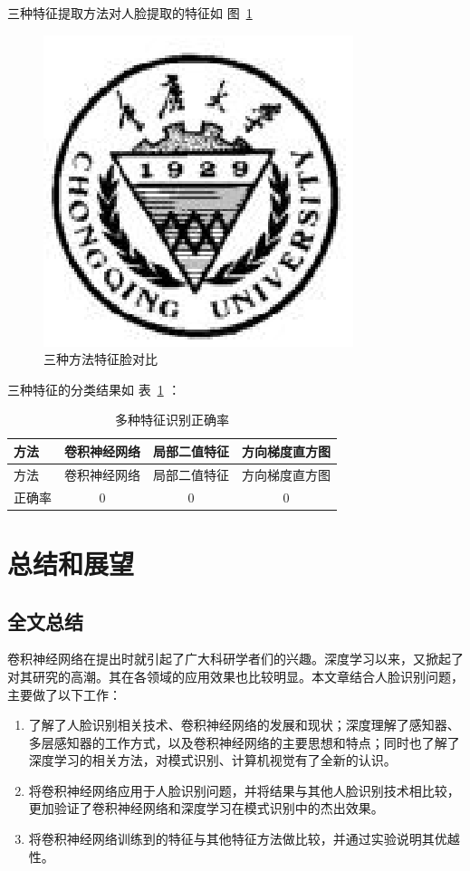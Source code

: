 \documentclass[bachelor,zhspacing]{cqu}  %
\def\tightlist{}
\begin{document}
三种特征提取方法对人脸提取的特征如 图~\ref{fig:egi-face}

\begin{figure}[htbp]
\centering
\includegraphics{./pic/cqu.eps}
\caption{三种方法特征脸对比}\label{fig:egi-face}
\end{figure}

三种特征的分类结果如 表~\ref{tbl:res-fea} ：

\begin{longtable}[]{@{}lccc@{}}
\caption{\label{tbl:res-fea}多种特征识别正确率 }\tabularnewline
\toprule
方法 & 卷积神经网络 & 局部二值特征 & 方向梯度直方图\tabularnewline
\midrule
\endfirsthead
\toprule
方法 & 卷积神经网络 & 局部二值特征 & 方向梯度直方图\tabularnewline
\midrule
\endhead
正确率 & 0 & 0 & 0\tabularnewline
\bottomrule
\end{longtable}

\section{总结和展望}\label{ux603bux7ed3ux548cux5c55ux671b}

\subsection{全文总结}\label{ux5168ux6587ux603bux7ed3}

卷积神经网络在提出时就引起了广大科研学者们的兴趣。深度学习以来，又掀起了对其研究的高潮。其在各领域的应用效果也比较明显。本文章结合人脸识别问题，主要做了以下工作：

\begin{enumerate}
\def\labelenumi{\arabic{enumi}.}
\tightlist
\item
  了解了人脸识别相关技术、卷积神经网络的发展和现状；深度理解了感知器、多层感知器的工作方式，以及卷积神经网络的主要思想和特点；同时也了解了深度学习的相关方法，对模式识别、计算机视觉有了全新的认识。
\item
  将卷积神经网络应用于人脸识别问题，并将结果与其他人脸识别技术相比较，更加验证了卷积神经网络和深度学习在模式识别中的杰出效果。
\item
  将卷积神经网络训练到的特征与其他特征方法做比较，并通过实验说明其优越性。
\end{enumerate}
\end{document}
